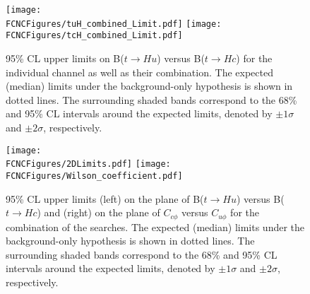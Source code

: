 \begin{figure}[htb]
\centering
\texttt{[image: \\FCNCFigures/tuH\_combined\_Limit.pdf]}
\texttt{[image: \\FCNCFigures/tcH\_combined\_Limit.pdf]}
\caption{95\% CL upper limits on B($t\rightarrow Hu$) versus B($t\rightarrow Hc$) for the individual channel as well as their combination. %
The expected (median) limits under the background-only hypothesis is shown in dotted lines. The surrounding shaded bands correspond to the 68\% and 95\% CL
intervals around the expected limits, denoted by $\pm1\sigma$ and $\pm2\sigma$, respectively. }
\label{fig:combined_limit}
\end{figure}


\begin{figure}[htb]
\centering
\texttt{[image: \\FCNCFigures/2DLimits.pdf]}
\texttt{[image: \\FCNCFigures/Wilson\_coefficient.pdf]}
\caption{95\% CL upper limits (left) on the plane of B($t\rightarrow Hu$) versus B($t\rightarrow Hc$) and (right) on the plane of $C_{c\phi}$ versus $C_{u\phi}$ for the combination of the searches. The expected
(median) limits under the background-only hypothesis is shown in dotted lines. The surrounding shaded bands correspond to
the 68\% and 95\% CL intervals around the expected limits, denoted by $\pm1\sigma$ and $\pm2\sigma$, respectively.}
\label{fig:combined_2D_limit}
\end{figure}
